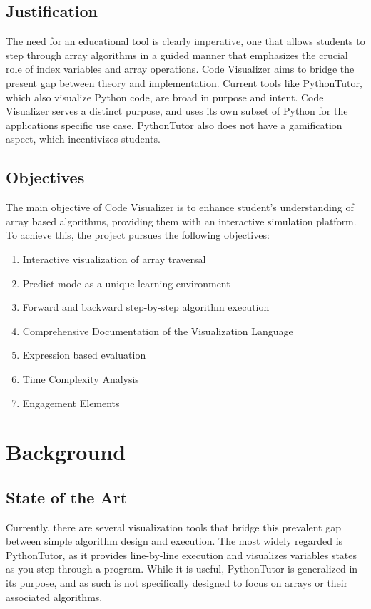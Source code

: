 \documentclass{IEEEtran}
\begin{document}
\subsection{Justification}
The need for an educational tool is clearly imperative, one that allows students to step through array algorithms in a guided manner that emphasizes the crucial role of index variables and array operations. Code Visualizer aims to bridge the present gap between theory and implementation. Current tools like PythonTutor, which also visualize Python code, are broad in purpose and intent. Code Visualizer serves a distinct purpose, and uses its own subset of Python for the applications specific use case. PythonTutor also does not have a gamification aspect, which incentivizes students.
\subsection{Objectives}
The main objective of Code Visualizer is to enhance student's understanding of array based algorithms, providing them with an interactive simulation platform. To achieve this, the project pursues the following objectives:
\begin{enumerate}
    \item {Interactive visualization of array traversal}
    \item {Predict mode as a unique learning environment}
    \item {Forward and backward step-by-step algorithm execution}
    \item {Comprehensive Documentation of the Visualization Language}
    \item {Expression based evaluation}
    \item {Time Complexity Analysis}
    \item {Engagement Elements}
\end{enumerate}
\section{Background}
\subsection{State of the Art}
Currently, there are several visualization tools that bridge this prevalent gap between simple algorithm design and execution. The most widely regarded is PythonTutor, as it provides line-by-line execution and visualizes variables states as you step through a program. While it is useful, PythonTutor is generalized in its purpose, and as such is not specifically designed to focus on arrays or their associated algorithms.
\end{document}
